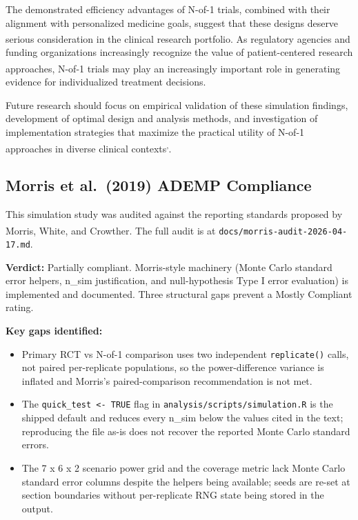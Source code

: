 \documentclass[
  11pt,
]{article}
\providecommand{\tightlist}{%
  \setlength{\itemsep}{0pt}\setlength{\parskip}{0pt}}
\begin{document}
The demonstrated efficiency advantages of N-of-1 trials, combined with
their alignment with personalized medicine goals, suggest that these
designs deserve serious consideration in the clinical research
portfolio\textsuperscript{}.
As regulatory agencies and funding organizations increasingly recognize
the value of patient-centered research
approaches\textsuperscript{}, N-of-1
trials may play an increasingly important role in generating evidence
for individualized treatment decisions.

Future research should focus on empirical validation of these simulation
findings, development of optimal design and analysis methods, and
investigation of implementation strategies that maximize the practical
utility of N-of-1 approaches in diverse clinical
contexts\textsuperscript{,}.

\subsection{Morris et al.~(2019) ADEMP
Compliance}\label{morris-et-al.-2019-ademp-compliance}

This simulation study was audited against the reporting standards
proposed by Morris, White, and
Crowther\textsuperscript{}. The full
audit is at \texttt{docs/morris-audit-2026-04-17.md}.

\textbf{Verdict:} Partially compliant. Morris-style machinery (Monte
Carlo standard error helpers, n\_sim justification, and null-hypothesis
Type I error evaluation) is implemented and documented. Three structural
gaps prevent a Mostly Compliant rating.

\textbf{Key gaps identified:}

\begin{itemize}
\tightlist
\item
  Primary RCT vs N-of-1 comparison uses two independent
  \texttt{replicate()} calls, not paired per-replicate populations, so
  the power-difference variance is inflated and Morris's
  paired-comparison recommendation is not met.
\item
  The \texttt{quick\_test\ \textless{}-\ TRUE} flag in
  \texttt{analysis/scripts/simulation.R} is the shipped default and
  reduces every n\_sim below the values cited in the text; reproducing
  the file as-is does not recover the reported Monte Carlo standard
  errors.
\item
  The 7 x 6 x 2 scenario power grid and the coverage metric lack Monte
  Carlo standard error columns despite the helpers being available;
  seeds are re-set at section boundaries without per-replicate RNG state
  being stored in the output.
\end{itemize}
\end{document}
